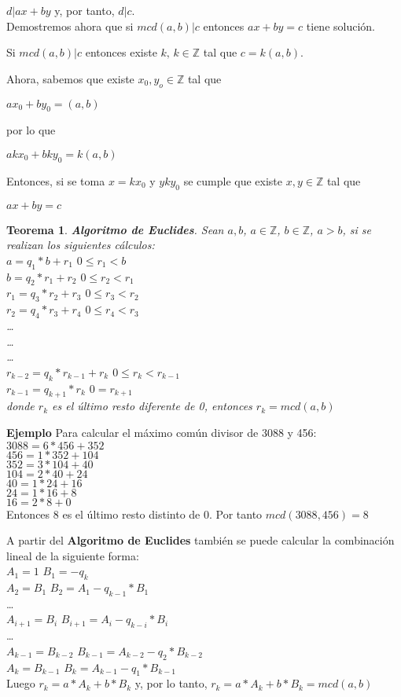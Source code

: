 \documentclass[a4paper,1pt]{report}
\newtheorem*{teo}{Teorema}
\begin{document}
$d|ax+by$ y, por tanto, $d|c$.
\\

Demostremos ahora que si $mcd(a,b)|c$ entonces $ax+by=c$ tiene solución.

Si $mcd(a,b)|c$ entonces existe $k,\, k\in\mathbb{Z}$ tal que $c=k(a,b)$.

Ahora, sabemos que existe $x_0,y_o\in\mathbb{Z}$ tal que

$ax_0+by_0=(a,b)$

por lo que

$akx_0+bky_0=k(a,b)$

Entonces, si se toma $x=kx_0$ y $yky_0$ se cumple que existe $x,y\in\mathbb{Z}$ tal que 

$ax+by=c$


\newpage
\begin{teo}
 \textbf{Algoritmo de Euclides}. Sean $a,b$, $a\in\mathbb{Z}$, $b\in\mathbb{Z}$, $a>b$, si se realizan los siguientes cálculos:\\
 $a=q_1*b+r_1$ $0\leq r_1<b$\\
 $b=q_2*r_1+r_2$  $0\leq r_2<r_1$\\
 $r_1=q_3*r_2+r_3$ $0\leq r_3<r_2$\\
 $r_2=q_4*r_3+r_4$ $0\leq r_4<r_3$\\
 \dots\\
 \dots\\
 \dots\\
 $r_{k-2}=q_k*r_{k-1}+r_k$ $0\leq r_k<r_{k-1}$\\
 $r_{k-1}=q_{k+1}*r_{k}$ $0=r_{k+1}$\\
 donde $r_k$ es el último resto diferente de 0, entonces $r_k=mcd(a,b)$
\end{teo}

\textbf{Ejemplo}
Para calcular el máximo común divisor de 3088 y 456:\\
$3088=6*456+352$\\
$456=1*352+104$\\
$352=3*104+40$\\
$104=2*40+24$\\
$40=1*24+16$\\
$24=1*16+8$\\
$16=2*8 + 0$\\
Entonces 8 es el último resto distinto de 0. Por tanto $mcd(3088,456)=8$

A partir del \textbf{Algoritmo de Euclides} también se puede calcular la combinación lineal de la siguiente forma:\\
$A_1=1$ $B_1=-q_k$\\
$A_2=B_1$ $B_2=A_1-q_{k-1}*B_1$\\
\dots\\
$A_{i+1}=B_i$ $B_{i+1}=A_i-q_{k-i}*B_i$\\
\dots\\
$A_{k-1}=B_{k-2}$ $B_{k-1}=A_{k-2}-q_2*B_{k-2}$\\
$A_{k}=B_{k-1}$ $B_{k}=A_{k-1}-q_1*B_{k-1}$\\
Luego $r_k=a*A_k+b*B_k$ y, por lo tanto, $r_k=a*A_k+b*B_k=mcd(a,b)$
\end{document}
